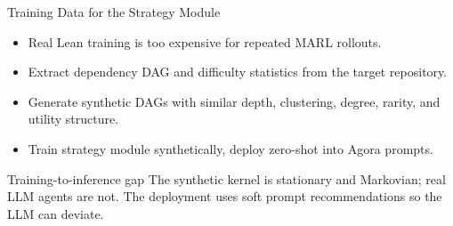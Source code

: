 \documentclass[10pt,aspectratio=169]{beamer}
\begin{document}
\begin{frame}{Training Data for the Strategy Module}
\small
\begin{itemize}
  \item Real Lean training is too expensive for repeated MARL rollouts.
  \item Extract dependency DAG and difficulty statistics from the target repository.
  \item Generate synthetic DAGs with similar depth, clustering, degree, rarity, and utility structure.
  \item Train strategy module synthetically, deploy zero-shot into Agora prompts.
\end{itemize}

\begin{block}{Training-to-inference gap}
The synthetic kernel is stationary and Markovian; real LLM agents are not. The deployment uses soft prompt recommendations so the LLM can deviate.
\end{block}
\end{frame}



\end{document}
